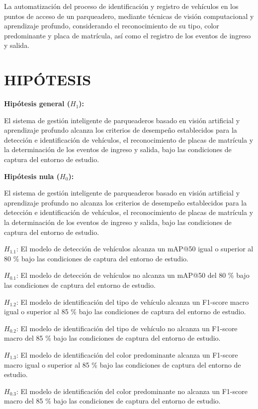 La automatización del proceso de identificación y registro de vehículos en los
puntos de acceso de un parqueadero, mediante técnicas de visión computacional y
aprendizaje profundo, considerando el reconocimiento de su tipo, color
predominante y placa de matrícula, así como el registro de los eventos de
ingreso y salida.

\section*{HIPÓTESIS}

\textbf{Hipótesis general ($H_1$):}

El sistema de gestión inteligente de parqueaderos basado en visión artificial y
aprendizaje profundo alcanza los criterios de desempeño establecidos para la
detección e identificación de vehículos, el reconocimiento de placas de
matrícula y la determinación de los eventos de ingreso y salida, bajo las
condiciones de captura del entorno de estudio.

\textbf{Hipótesis nula ($H_0$):}

El sistema de gestión inteligente de parqueaderos basado en visión artificial y
aprendizaje profundo no alcanza los criterios de desempeño establecidos para la
detección e identificación de vehículos, el reconocimiento de placas de
matrícula y la determinación de los eventos de ingreso y salida, bajo las
condiciones de captura del entorno de estudio.

$H_{1{.}1}$: El modelo de detección de vehículos alcanza un mAP@50 igual o superior
al 80 \% bajo las condiciones de captura del entorno de estudio.

$H_{0{.}1}$: El modelo de detección de vehículos no alcanza un mAP@50 del 80 \%
bajo las condiciones de captura del entorno de estudio.

$H_{1{.}2}$: El modelo de identificación del tipo de vehículo alcanza un F1-score
macro igual o superior al 85 \% bajo las condiciones de captura del entorno de
estudio.

$H_{0{.}2}$: El modelo de identificación del tipo de vehículo no alcanza un
F1-score macro del 85 \% bajo las condiciones de captura del entorno de estudio.

$H_{1{.}3}$: El modelo de identificación del color predominante alcanza un F1-score
macro igual o superior al 85 \% bajo las condiciones de captura del entorno de
estudio.

$H_{0{.}3}$: El modelo de identificación del color predominante no alcanza un
F1-score macro del 85 \% bajo las condiciones de captura del entorno de estudio.

